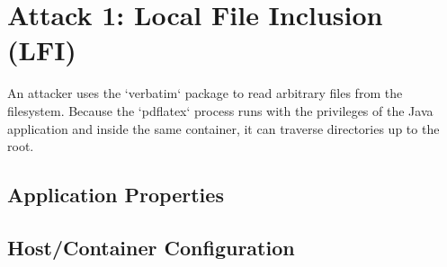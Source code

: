 \documentclass{article}
\begin{document}
\section*{Attack 1: Local File Inclusion (LFI)}

An attacker uses the `verbatim` package to read arbitrary files from the filesystem. 
Because the `pdflatex` process runs with the privileges of the Java application and inside the same container, it can traverse directories up to the root.

\subsection*{Application Properties}


\subsection*{Host/Container Configuration}

\end{document}

